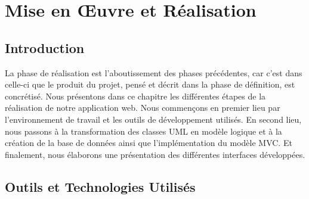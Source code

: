 \documentclass[12pt,a4paper]{report}
\begin{document}
	\chapter{Mise en Œuvre et Réalisation}
	
	\newpage
	
	\section{Introduction}
	La phase de réalisation est l'aboutissement des phases précédentes, car c'est dans celle-ci que le produit du projet, pensé et décrit dans la phase de définition, est concrétisé. Nous présentons dans ce chapitre les différentes étapes de la réalisation de notre application web. Nous commençons en premier lieu par l'environnement de travail et les outils de développement utilisés. En second lieu, nous passons à la transformation des classes UML en modèle logique et à la création de la base de données ainsi que l'implémentation du modèle MVC. Et finalement, nous élaborons une présentation des différentes interfaces développées.
	
	\section{Outils et Technologies Utilisés}
	

	
\end{document}
